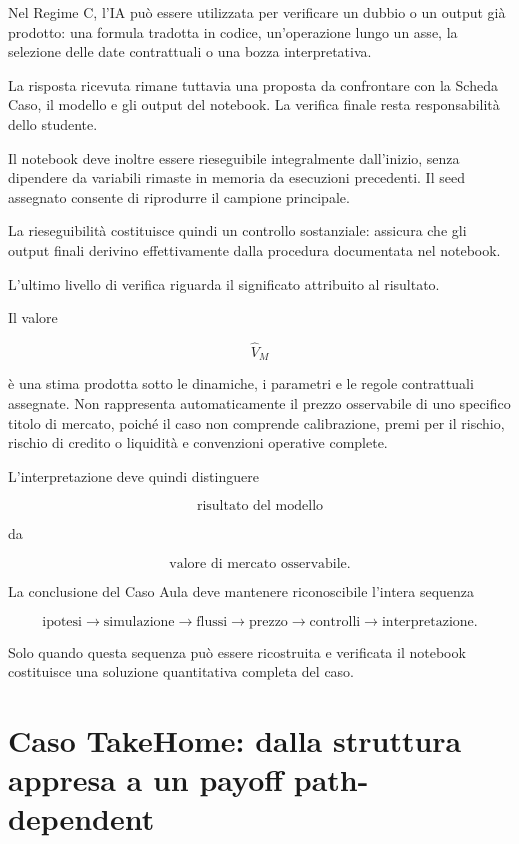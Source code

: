 Nel Regime C, l'IA pu\`o essere utilizzata per verificare un dubbio o un output
gi\`a prodotto: una formula tradotta in codice, un'operazione lungo un asse,
la selezione delle date contrattuali o una bozza interpretativa.

La risposta ricevuta rimane tuttavia una proposta da confrontare con la
Scheda Caso, il modello e gli output del notebook. La verifica finale resta
responsabilit\`a dello studente.

Il notebook deve inoltre essere rieseguibile integralmente dall'inizio, senza
dipendere da variabili rimaste in memoria da esecuzioni precedenti. Il seed
assegnato consente di riprodurre il campione principale.

La rieseguibilit\`a costituisce quindi un controllo sostanziale: assicura che
gli output finali derivino effettivamente dalla procedura documentata nel
notebook.

L'ultimo livello di verifica riguarda il significato attribuito al risultato.

Il valore

\[
\widehat V_M
\]

\noindent \`e una stima prodotta sotto le dinamiche, i parametri e le regole
contrattuali assegnate. Non rappresenta automaticamente il prezzo osservabile
di uno specifico titolo di mercato, poich\'e il caso non comprende
calibrazione, premi per il rischio, rischio di credito o liquidit\`a e
convenzioni operative complete.

L'interpretazione deve quindi distinguere

\[
\text{risultato del modello}
\]

\noindent da

\[
\text{valore di mercato osservabile}.
\]

La conclusione del Caso Aula deve mantenere riconoscibile l'intera sequenza

\[
\text{ipotesi}
\longrightarrow
\text{simulazione}
\longrightarrow
\text{flussi}
\longrightarrow
\text{prezzo}
\longrightarrow
\text{controlli}
\longrightarrow
\text{interpretazione}.
\]

Solo quando questa sequenza pu\`o essere ricostruita e verificata il notebook
costituisce una soluzione quantitativa completa del caso.


\section{Caso TakeHome: dalla struttura appresa a un payoff path-dependent}

